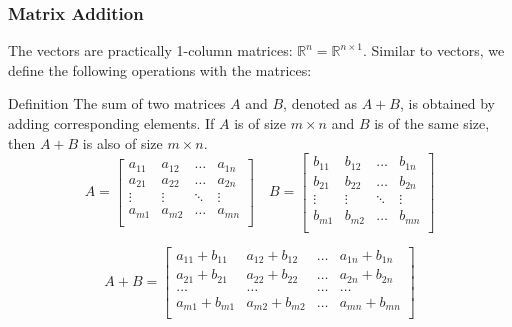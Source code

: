 \documentclass{beamer}
\newcommand{\R}{\mathbb{R}}
\begin{document}
\begin{frame}
  \frametitle{Matrix Addition}
The vectors are practically 1-column matrices: $\R^n = \R^{n\times 1}$. Similar to vectors, we define the following operations with the matrices:
  \pause

  \begin{block}{Definition}
    The sum of two matrices \(A\) and \(B\), denoted as \(A + B\), is obtained by adding corresponding elements. If \(A\) is of size \(m \times n\) and \(B\) is of the same size, then \(A + B\) is also of size \(m \times n\).
       \[
      A = \begin{bmatrix}
        a_{11} & a_{12} & \ldots & a_{1n} \\
        a_{21} & a_{22} & \ldots & a_{2n} \\
        \vdots & \vdots & \ddots & \vdots \\
        a_{m1} & a_{m2} & \ldots & a_{mn} \\
      \end{bmatrix}
      \quad
      B = \begin{bmatrix}
        b_{11} & b_{12} & \ldots & b_{1n} \\
        b_{21} & b_{22} & \ldots & b_{2n} \\
        \vdots & \vdots & \ddots & \vdots \\
        b_{m1} & b_{m2} & \ldots & b_{mn} \\
      \end{bmatrix}
    \]

    \[
      A + B = \begin{bmatrix}
        a_{11} + b_{11} & a_{12} + b_{12} & \ldots & a_{1n} + b_{1n} \\
        a_{21} + b_{21} & a_{22} + b_{22} & \ldots & a_{2n} + b_{2n} \\
        \ldots & \ldots & \ldots & \ldots \\
        a_{m1} + b_{m1} & a_{m2} + b_{m2} & \ldots & a_{mn} + b_{mn} \\
      \end{bmatrix}
    \]
  \end{block}


\end{frame}
\end{document}
